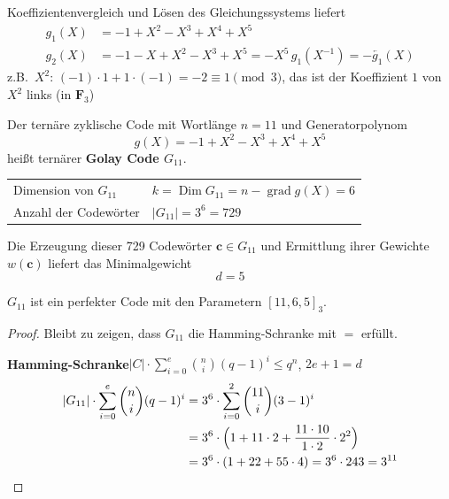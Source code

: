 Koeffizientenvergleich und Lösen des Gleichungssystems liefert
\begin{align*}
g_1(X) &= -1 + X^2 - X^3 + X^4 + X^5 \\
g_2(X) &= -1 - X + X^2 - X^3 + X^5 = -X^5\, g_1(X^{-1}) = -\overleftarrow{g_1}(X)
\end{align*}
z.B.\ $X^2$: \qquad $(-1)\cdot 1 + 1\cdot(-1) = -2 \equiv 1 \pmod{3}$, \quad das ist der Koeffizient $1$ von $X^2$ links (in $\mathbf{F}_3$)

\begin{definition}
Der ternäre zyklische Code mit Wortlänge $n = 11$ und Generatorpolynom
\[
g(X) = -1 + X^2 - X^3 + X^4 + X^5
\]
heißt ternärer \textbf{Golay Code $G_{11}$}.
\end{definition}

\begin{tabular}{ll}
Dimension von $G_{11}$ & $k = \operatorname{Dim} G_{11} = n - \operatorname{grad} g(X) = 6$ \\
Anzahl der Codewörter & $|G_{11}| = 3^6 = 729$
\end{tabular}

Die Erzeugung dieser 729 Codewörter $\mathbf{c} \in G_{11}$ und Ermittlung ihrer Gewichte $w(\mathbf{c})$ liefert das Minimalgewicht
\[
d = 5
\]

\begin{satz}
$G_{11}$ ist ein perfekter Code mit den Parametern $[11, 6, 5]_3$.
\end{satz}

\begin{proof}
Bleibt zu zeigen, dass $G_{11}$ die Hamming-Schranke mit \glqq$=$\grqq{} erfüllt.

\textbf{Hamming-Schranke}\quad $|C| \cdot \displaystyle\sum_{i=0}^{e} \binom{n}{i} (q-1)^i \le q^n$, \quad $2e + 1 = d$
\begin{align*}
|G_{11}| \cdot \sum_{i=0}^{e} \binom{n}{i} (q-1)^i &= 3^6 \cdot \sum_{i=0}^{2} \binom{11}{i} (3-1)^i \\
&= 3^6 \cdot \Bigl(1 + 11 \cdot 2 + \frac{11\cdot 10}{1\cdot 2} \cdot 2^2\Bigr) \\
&= 3^6 \cdot (1 + 22 + 55 \cdot 4) = 3^6 \cdot 243 = 3^{11} \qedhere
\end{align*}
\end{proof}
